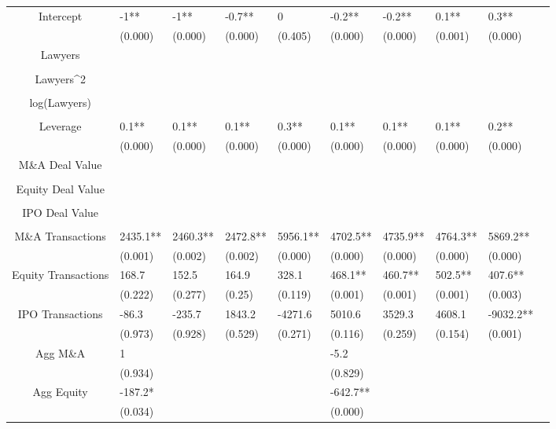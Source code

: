 \documentclass{article}
\begin{document}
\begin{table}[H]
\begin{tabular}{|clllllllll|}
Intercept & -1** & -1** & -0.7** & 0 & -0.2** & -0.2** & 0.1** & 0.3** & \\ 
   & (0.000) & (0.000) & (0.000) & (0.405) & (0.000) & (0.000) & (0.001) & (0.000) & \\ 
  Lawyers &  &  &  &  &  &  &  &  & \\ 
   &  &  &  &  &  &  &  &  & \\ 
  Lawyers^2 &  &  &  &  &  &  &  &  & \\ 
   &  &  &  &  &  &  &  &  & \\ 
  log(Lawyers) &  &  &  &  &  &  &  &  & \\ 
   &  &  &  &  &  &  &  &  & \\ 
  Leverage & 0.1** & 0.1** & 0.1** & 0.3** & 0.1** & 0.1** & 0.1** & 0.2** & \\ 
   & (0.000) & (0.000) & (0.000) & (0.000) & (0.000) & (0.000) & (0.000) & (0.000) & \\ 
  M\&A Deal Value &  &  &  &  &  &  &  &  & \\ 
   &  &  &  &  &  &  &  &  & \\ 
  Equity Deal Value &  &  &  &  &  &  &  &  & \\ 
   &  &  &  &  &  &  &  &  & \\ 
  IPO Deal Value &  &  &  &  &  &  &  &  & \\ 
   &  &  &  &  &  &  &  &  & \\ 
  M\&A Transactions & 2435.1** & 2460.3** & 2472.8** & 5956.1** & 4702.5** & 4735.9** & 4764.3** & 5869.2** & \\ 
   & (0.001) & (0.002) & (0.002) & (0.000) & (0.000) & (0.000) & (0.000) & (0.000) & \\ 
  Equity Transactions & 168.7 & 152.5 & 164.9 & 328.1 & 468.1** & 460.7** & 502.5** & 407.6** & \\ 
   & (0.222) & (0.277) & (0.25) & (0.119) & (0.001) & (0.001) & (0.001) & (0.003) & \\ 
  IPO Transactions & -86.3 & -235.7 & 1843.2 & -4271.6 & 5010.6 & 3529.3 & 4608.1 & -9032.2** & \\ 
   & (0.973) & (0.928) & (0.529) & (0.271) & (0.116) & (0.259) & (0.154) & (0.001) & \\ 
  Agg M\&A & 1 &  &  &  & -5.2 &  &  &  & \\ 
   & (0.934) &  &  &  & (0.829) &  &  &  & \\ 
  Agg Equity & -187.2* &  &  &  & -642.7** &  &  &  & \\ 
   & (0.034) &  &  &  & (0.000) &  &  &  & \\ 

\end{tabular}
\end{table}
\end{document}
